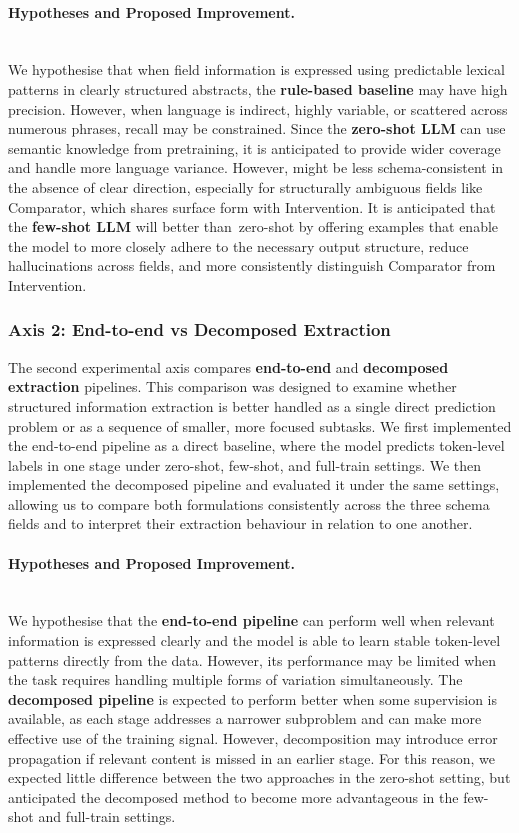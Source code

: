 \documentclass{article}
\begin{document}
\paragraph{Hypotheses and Proposed Improvement.}\mbox{}\\
We hypothesise that when field information is expressed using predictable lexical patterns in clearly structured abstracts, the \textbf{rule-based baseline} may have high precision. However, when language is indirect, highly variable, or scattered across numerous phrases, recall may be constrained. Since the \textbf{zero-shot LLM} can use semantic knowledge from pretraining, it is anticipated to provide wider coverage and handle more language variance. However, might be less schema-consistent in the absence of clear direction, especially for structurally ambiguous fields like Comparator, which shares surface form with Intervention. It is anticipated that the \textbf{few-shot LLM} will better than zero-shot by offering examples that enable the model to more closely adhere to the necessary output structure, reduce hallucinations across fields, and more consistently distinguish Comparator from Intervention.


\subsubsection{Axis 2: End-to-end vs Decomposed Extraction}
The second experimental axis compares \textbf{end-to-end} and \textbf{decomposed extraction} pipelines. This comparison was designed to examine whether structured information extraction is better handled as a single direct prediction problem or as a sequence of smaller, more focused subtasks. We first implemented the end-to-end pipeline as a direct baseline, where the model predicts token-level labels in one stage under zero-shot, few-shot, and full-train settings. We then implemented the decomposed pipeline and evaluated it under the same settings, allowing us to compare both formulations consistently across the three schema fields and to interpret their extraction behaviour in relation to one another.

\paragraph{Hypotheses and Proposed Improvement.}\mbox{}\\
We hypothesise that the \textbf{end-to-end pipeline} can perform well when relevant information is expressed clearly and the model is able to learn stable token-level patterns directly from the data. However, its performance may be limited when the task requires handling multiple forms of variation simultaneously. The \textbf{decomposed pipeline} is expected to perform better when some supervision is available, as each stage addresses a narrower subproblem and can make more effective use of the training signal. However, decomposition may introduce error propagation if relevant content is missed in an earlier stage. For this reason, we expected little difference between the two approaches in the zero-shot setting, but anticipated the decomposed method to become more advantageous in the few-shot and full-train settings.
\end{document}
